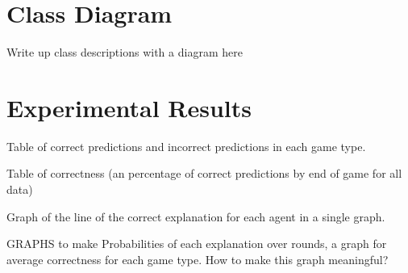 \documentclass[parskip]{cs4rep}
\begin{document}
\section{Class Diagram}

Write up class descriptions with a diagram here

\section{Experimental Results}

Table of correct predictions and incorrect predictions in each game type.

Table of correctness (an percentage of correct predictions by end of game for all data)

Graph of the line of the correct explanation for each agent in a single graph.

GRAPHS to make
Probabilities of each explanation over rounds, a graph for average correctness for each game type.
How to make this graph meaningful?



\end{document}
